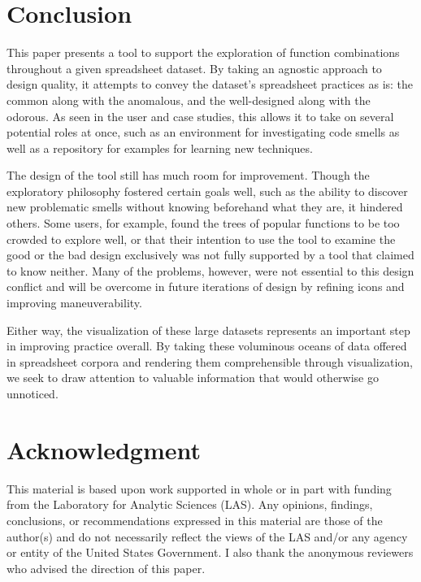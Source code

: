 \documentclass[conference]{IEEEtran}
\begin{document}
	\section{Conclusion}
	
	This paper presents a tool to support the exploration of function combinations
	throughout a given spreadsheet dataset. By taking an agnostic approach to
	design quality, it attempts to convey the dataset's spreadsheet practices as
	is: the common along with the anomalous, and the well-designed along with the
	odorous. As seen in the user and case studies, this allows it to take on
	several potential roles at once, such as an environment for investigating code
	smells as well as a repository for examples for learning new techniques. \par
	
	The design of the tool still has much room for improvement. Though the
	exploratory philosophy fostered certain goals well, such as the ability to
	discover new problematic smells without knowing beforehand what they are, it
	hindered others. Some users, for example, found the trees of popular functions
	to be too crowded to explore well, or that their intention to use the tool to
	examine the good or the bad design exclusively was not fully supported by a
	tool that claimed to know neither. Many of the problems, however, were not
	essential to this design conflict and will be overcome in future iterations of
	design by refining icons and improving maneuverability. \par
	
	Either way, the visualization of these large datasets represents an important
	step in improving practice overall. By taking these voluminous oceans of data
	offered in spreadsheet corpora and rendering them comprehensible through
	visualization, we seek to draw attention to valuable information that would
	otherwise go unnoticed.
	
	\section*{Acknowledgment}
	
	This material is based upon work supported in whole or in part with funding
	from the Laboratory for Analytic Sciences (LAS). Any opinions, findings,
	conclusions, or recommendations expressed in this material are those of the
	author(s) and do not necessarily reflect the views of the LAS and/or any agency
	or entity of the United States Government. I also thank the anonymous reviewers
	who advised the direction of this paper.
	
\end{document}
